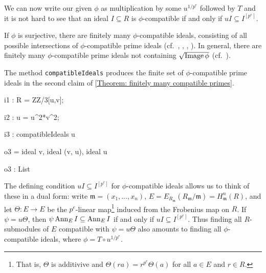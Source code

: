 \documentclass{amsart}
\begin{document}
We can now write our given $\phi$ as multiplication by some $u^{1/p^e}$ followed by $T$ and it is not hard to see that
an ideal $I\subseteq R$ is $\phi$-compatible if and only if $u I \subseteq I^{[p^e]}$.

\begin{theorem}\label{Theorem: finitely many compatible primes}
If $\phi$ is surjective, there are finitely many $\phi$-compatible ideals, consisting of all possible intersections
of $\phi$-compatible prime ideals \textup(cf.\ \cite{KumarMehtaFiniteness}, \cite{SchwedeFAdjunction},
\cite{SharpGradedAnnihilatorsOfModulesOverTheFrobeniusSkewPolynomialRing}, \cite{EnescuHochsterTheFrobeniusStructureOfLocalCohomology}\textup).
In general, there are finitely many $\phi$-compatible prime ideals not containing $\sqrt{\operatorname{Image} \phi}$ \textup(cf.\ \cite{KatzmanSchwedeAlgorithm}\textup).

\end{theorem}

The method \texttt{compatibleIdeals} produces the finite set of $\phi$-compatible prime ideals in the second claim of \autoref{Theorem: finitely many compatible primes}.

\medskip
{\small
{}
\begin{MyVerbatim}
i1 : R = ZZ/3[u,v];

i2 : u = u^2*v^2;

i3 : compatibleIdeals u

o3 = {ideal v, ideal (v, u), ideal u}

o3 : List
\end{MyVerbatim}
}\medskip

The defining condition $u I \subseteq I^{[p^e]}$ for $\phi$-compatible ideals allows us to
think of these in a dual form: write $\mathfrak{m}=(x_1, \dots, x_n)$,
$E=E_{R_\mathfrak{m}}(R_{\mathfrak{m}}/\mathfrak{m})=H^n_{\mathfrak{m}} (R)$, and let
$\Theta: E \rightarrow E$ be the $p^e$-linear map\footnote{That is, $\Theta$ is additivive and $\Theta (r a)= r^{p^e} \Theta (a)$ for all $a\in E$ and $r\in R$.}
induced from the Frobenius map on $R$.
If $\psi=u \Theta$, then $\psi \operatorname{{Ann}}_E I \subseteq \operatorname{{Ann}}_E I$ if and only if $u I \subseteq  I^{[p^e]}$.
Thus finding all $R$-submodules of $E$ compatible with $\psi=u \Theta$ also amounts to finding all
$\phi$-compatible ideals, where $\phi=T \circ u^{1/p^e}$.
\end{document}
